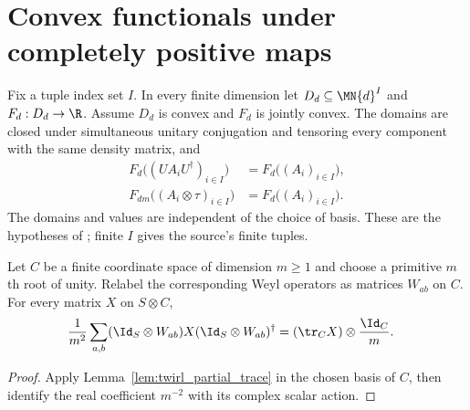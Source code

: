 \section{Convex functionals under completely positive maps}
\label{sec:convex_functional_monotonicity}

\begin{definition}
    \label{def:convex_matrix_functional}
    \leanok
    Fix a tuple index set $I$. In every finite dimension let
    $D_d\subseteq\MN{d}^{I}$ and $F_d:D_d\to\R$.
    Assume $D_d$ is convex and $F_d$ is jointly convex. The domains are
    closed under simultaneous unitary conjugation and tensoring every
    component with the same density matrix, and
    \begin{align}
        F_d\bigl((UA_iU^\dagger)_{i\in I}\bigr)
            &=F_d\bigl((A_i)_{i\in I}\bigr),
        \label{eq:convex_functional_unitary}\\
        F_{dm}\bigl((A_i\otimes\tau)_{i\in I}\bigr)
            &=F_d\bigl((A_i)_{i\in I}\bigr).
        \label{eq:convex_functional_ancilla}
    \end{align}
    The domains and values are independent of the choice of basis.
    These are the hypotheses of \cite[Theorem~5.16]{Wolf2012Quantum};
    finite $I$ gives the source's finite tuples.
\end{definition}

\begin{lemma}
    \label{lem:convex_functional_weyl_average}
    \leanok
    Let $C$ be a finite coordinate space of dimension $m\ge1$ and choose
    a primitive $m$th root of unity. Relabel the corresponding Weyl
    operators as matrices $W_{ab}$ on $C$. For every matrix $X$ on $S\otimes C$,
    \begin{align}
        \frac1{m^2}\sum_{a,b}
            (\Id_S\otimes W_{ab})X(\Id_S\otimes W_{ab})^\dagger
            &=(\tr_C X)\otimes\frac{\Id_C}{m}.
        \label{eq:convex_functional_twirl}
    \end{align}
\end{lemma}
\begin{proof}
    \leanok
    Apply Lemma~\ref{lem:twirl_partial_trace} in the chosen basis of $C$,
    then identify the real coefficient $m^{-2}$ with its complex scalar action.
\end{proof}

